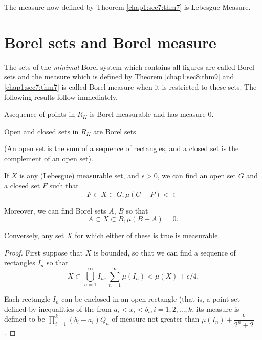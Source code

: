 The measure now defined by Theorem \ref{chap1:sec7:thm7} is Lebesgue Measure.

\section{Borel sets and Borel measure}\label{chap1:sec9}

The sets of the {\em minimal} Borel system which contains all figures
are called Borel sets and the measure which is defined by Theorem
\ref{chap1:sec8:thm9}
and \ref{chap1:sec7:thm7} is called Borel measure when it is
restricted to these sets. The 
following results follow immediately. 

\begin{theorem}\label{chap1:sec9:thm10} %
  A\pageoriginale sequence of points in $R_K$ is Borel measurable and
  has measure 0. 
\end{theorem}

\begin{theorem}\label{chap1:sec9:thm11}%
  Open and closed sets in $R_K$ are Borel sets. 
\end{theorem}

(An open set is the sum of a sequence of rectangles, and a closed set
is the complement of an open set). 

\begin{theorem}\label{chap1:sec9:thm12}%
If $X$ is any (Lebesgue) measurable set, and $\epsilon>0$, we can find
an open set $G$ and a closed set $F$ such that
$$
F \subset X \subset G , \mu (G-P)< \in
$$

Moreover, we can find Borel sets $A$, $B$ so that
$$
A \subset X \subset B , \mu (B-A)=0.
$$

Conversely, any set $X$ for which either of these is true is measurable.
\end{theorem}

\begin{proof}
First suppose that $X$ is bounded, so that we can find a sequence of
rectangles $I_n$ so that 
$$
X \subset \bigcup^{\infty}_{n=1} I_n, \sum^{\infty}_{n=1} \mu (I_n)<
\mu (X) + \epsilon/4. 
$$

Each rectangle $I_n$ can be enclosed in an open rectangle (that is, a
point set defined by inequalities of the from $a_i < x_i < b_i,
i=1,2,\ldots,k$, its measure is defined to be
$\prod\limits^{k}_{i=1}(b_i - a_i)Q_n$ of measure not
greater than  $\mu (I_n) + \dfrac{\epsilon}{2^n +2}$. 
\end{proof}

